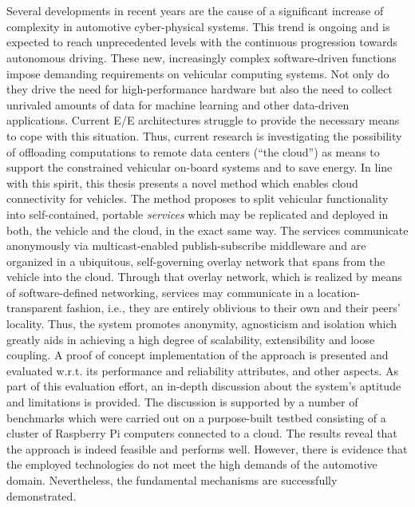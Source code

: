 \chapter{\abstractname}
Several developments in recent years are the cause of a significant increase of complexity in automotive cyber-physical systems. This trend is ongoing and is expected to reach unprecedented levels with the continuous progression towards autonomous driving. These new, increasingly complex software-driven functions impose demanding requirements on vehicular computing systems. Not only do they drive the need for high-performance hardware but also the need to collect unrivaled amounts of data for machine learning and other data-driven applications. Current E/E architectures struggle to provide the necessary means to cope with this situation. Thus, current research is investigating the possibility of offloading computations to remote data centers (``the cloud'') as means to support the constrained vehicular on-board systems and to save energy. 
In line with this spirit, this thesis presents a novel method which enables cloud connectivity for vehicles.
The method proposes to split vehicular functionality into self-contained, portable \emph{services} which may be replicated and deployed in both, the vehicle and the cloud, in the exact same way. The services communicate anonymously via multicast-enabled publish-subscribe middleware and are organized in a ubiquitous, self-governing overlay network that spans from the vehicle into the cloud. Through that overlay network, which is realized by means of software-defined networking, services may communicate in a location-transparent fashion, i.e., they are entirely oblivious to their own and their peers' locality. 
Thus, the system promotes anonymity, agnosticism and isolation which greatly aids in achieving a high degree of scalability, extensibility and loose coupling. 
A proof of concept implementation of the approach is presented and evaluated w.r.t. its performance and reliability attributes, and other aspects. 
As part of this evaluation effort, an in-depth discussion about the system's aptitude and limitations is provided. The discussion is supported by a number of benchmarks which were carried out on a purpose-built testbed consisting of a cluster of Raspberry Pi computers connected to a cloud. The results reveal that the approach is indeed feasible and performs well. However, there is evidence that the employed technologies do not meet the high demands of the automotive domain. Nevertheless, the fundamental mechanisms are successfully demonstrated.
%
%
%
%
%
%
%
%
%
%
%
%
%
%
%
%
%
%
%
%
%
%